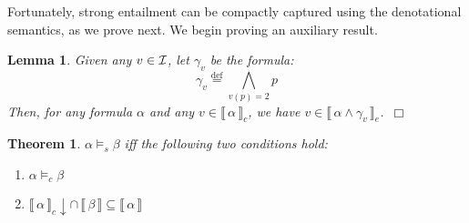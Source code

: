 \documentclass{tlp}
\newcommand{\eqdef}{\mathbin{\stackrel{\mathrm{def}}{=}}}
\def\cI{{\cal I}}
\def\down{\downarrow}
\newcommand{\den}[1]{\llbracket \, #1 \, \rrbracket}
\def\qed{~\hfill$\Box$}
\newtheorem{theorem}{Theorem}
\newtheorem{lemma}{Lemma}
\begin{document}
Fortunately, strong entailment can be compactly captured using the denotational semantics, as we prove next. We begin proving an auxiliary result. 
\begin{lemma}
\label{one_aux_lemma} 
Given any $v \in \cI$, let $\gamma_v$ be the formula: $$\gamma_{v} \eqdef \bigwedge_{v(p)=2} p$$ 
Then, for any formula $\alpha$ and any $v \in \den{\alpha}_c$, we have $v \in \den{\alpha \wedge \gamma_v}_e$.\qed
\end{lemma}

\begin{theorem}\label{th:sentail}
$\alpha \models_s \beta$ iff the following two conditions hold:
\begin{enumerate}
\item[(i)] $\alpha \models_c \beta$
\item[(ii)] $ \den{\alpha}_c \down \cap \, \den{\beta} \subseteq  \den{\alpha}$ 
\end{enumerate}
\end{theorem}
\end{document}
